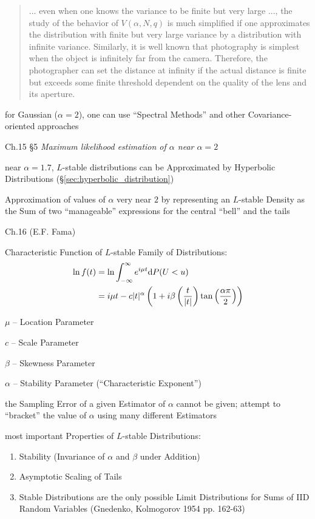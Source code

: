 \begin{quote}
  ... even when one knows the variance to be finite but very large ..., the
  study of the behavior of $V(\alpha, N, q)$ is much simplified if one
  approximates the distribution with finite but very large variance by a
  distribution with infinite variance. Similarly, it is well known that
  photography is simplest when the object is infinitely far from the camera.
  Therefore, the photographer can set the distance at infinity if the actual
  distance is finite but exceeds some finite threshold dependent on the quality
  of the lens and its aperture.
\end{quote}

for Gaussian ($\alpha = 2$), one can use ``Spectral Methods'' and other
Covariance-oriented approaches

Ch.15 \S 5 \emph{Maximum likelihood estimation of $\alpha$ near $\alpha = 2$}

near $\alpha = 1.7$, $L$-stable distributions can be Approximated by Hyperbolic
Distributions (\S\ref{sec:hyperbolic_distribution})

Approximation of values of $\alpha$ very near $2$ by representing an $L$-stable
Density as the Sum of two ``manageable'' expressions for the central ``bell''
and the tails

Ch.16 (E.F. Fama)

Characteristic Function of $L$-stable Family of Distributions:
\begin{align*}
  \ln f(t) & = \ln \int_{-\infty}^\infty e^{i\mu t} \mathrm{d}P(U < u) \\
           & = i\mu t - c|t|^\alpha \left(
              1 + i\beta\left(\frac{t}{|t|}\right)
              \tan\left(\frac{\alpha\pi}{2}\right)
           \right) \\
\end{align*}

$\mu$ -- Location Parameter

$c$ -- Scale Parameter

$\beta$ -- Skewness Parameter

$\alpha$ -- Stability Parameter (``Characteristic Exponent'')

the Sampling Error of a given Estimator of $\alpha$ cannot be given; attempt to
``bracket'' the value of $\alpha$ using many different Estimators

most important Properties of $L$-stable Distributions:
\begin{enumerate}
  \item Stability (Invariance of $\alpha$ and $\beta$ under Addition)
  \item Asymptotic Scaling of Tails
  \item Stable Distributions are the only possible Limit Distributions for Sums
    of IID Random Variables (Gnedenko, Kolmogorov 1954 pp. 162-63)
\end{enumerate}

